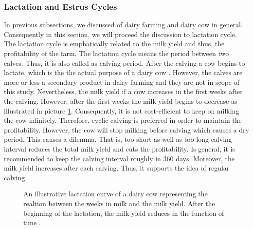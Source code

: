 \documentclass[english,12pt,a4paper,pdftex,elec,utf8]{aaltothesis}
\begin{document}
\subsubsection{Lactation and Estrus Cycles} \label{lactationandestruscyclessection}

In previous subsections, we discussed of dairy farming and dairy cow in general. Consequently in this section, we will proceed the discussion to lactation cycle. The lactation cycle is emphatically related to the milk yield and thus, the profitability of the farm. The lactation cycle means the period between two calves. Thus, it is also called as calving period. After the calving a cow begins to lactate, which is the the actual purpose of a dairy cow \cite{lehmahavaintoja}. However, the calves are more or less a secondary product in dairy farming and they are not in scope of this study. Nevertheless, the milk yield if a cow increases in the first weeks after the calving. However, after the first weeks the milk yield begins to decrease as illustrated in picture \ref{lactationapproximation}. Consequently, it is not cost-efficient to keep on milking the cow infinitely. Therefore, cyclic calving is preferred in order to maintain the profitability. However, the cow will stop milking before calving which causes a dry period. This causes a dilemma. That is, too short as well as too long calving interval reduces the total milk yield and cuts the profitability. Is general, it is recommended to keep the calving interval roughly in 360 days. Moreover, the milk yield increases after each calving. Thus, it supports the idea of regular calving \cite{lehmientuotoskasvaa}.

 \begin{figure}
 \centering
    \caption{An illustrative lactation curve of a dairy cow representing the realtion between the weeks in milk and the milk yield. After the beginning of the lactation, the milk yield reduces in the function of time \cite{lactationcurve}.} \label{lactationapproximation}
 \end{figure}
\end{document}
